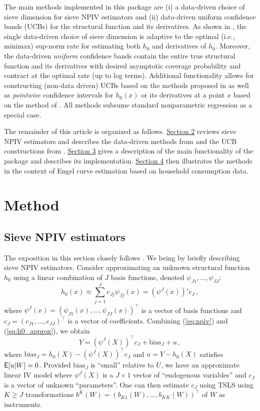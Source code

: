 \documentclass[
]{jss}
\begin{document}
The main methods implemented in this package are (i) a data-driven
choice of sieve dimension for sieve NPIV estimators and (ii) data-driven
uniform confidence bands (UCBs) for the structural function and its
derivatives. As shown in \citet{CCK}, the single data-driven choice of
sieve dimension is adaptive to the optimal (i.e., minimax) sup-norm rate
for estimating both \(h_0\) and derivatives of \(h_0\). Moreover, the
data-driven \emph{uniform} confidence bands contain the entire true
structural function and its derivatives with desired asymptotic coverage
probability and contract at the optimal rate (up to log terms).
Additional functionality allows for constructing (non-data driven) UCBs
based on the methods proposed in \citet{CCQE} as well as
\emph{pointwise} confidence intervals for \(h_0(x)\) or its derivatives
at a point \(x\) based on the method of \citet{ChenPouzo}. All methods
subsume standard nonparametric regression as a special case.

The remainder of this article is organized as follows.
\protect\hyperlink{method}{Section 2} reviews sieve NPIV estimators and
describes the data-driven methods from \citet{CCK} and the UCB
constructions from \citet{CCQE}. \protect\hyperlink{desc}{Section 3}
gives a description of the main functionality of the package 
and describes its implementation. \protect\hyperlink{engel}{Section 4}
then illustrates the methods in the context of Engel curve estimation
based on household consumption data.

\hypertarget{method}{%
\section{Method}\label{method}}

\hypertarget{sieve-npiv-estimators}{%
\subsection{Sieve NPIV estimators}\label{sieve-npiv-estimators}}

The exposition in this section closely follows \citet{CCK}. We being by
briefly describing sieve NPIV estimators. Consider approximating an
unknown structural function \(h_0\) using a linear combination of \(J\)
basis functions, denoted \(\psi_{J1},\ldots,\psi_{JJ}\):
\begin{equation}\label{eq:h0_approx}
 h_0(x) \approx \sum_{j=1}^J c_{Jj} \psi_{Jj}(x) = (\psi^J(x))'c_J\,,
\end{equation} where
\(\psi^J(x) = (\psi_{J1}(x),\ldots,\psi_{JJ}(x))^\top\) is a vector of
basis functions and \(c_J = (c_{J1},\ldots,c_{JJ})^\top\) is a vector of
coefficients. Combining (\ref{eq:npiv}) and (\ref{eq:h0_approx}), we
obtain \[
 Y = (\psi^J(X))^\top c_J + \mathrm{bias}_J + u\,,
\] where \(\mathrm{bias}_J = h_0(X) - (\psi^J(X))^\top c_J\) and
\(u = Y - h_0(X)\) satisfies \(\mathsf{E}[u|W] = 0\). Provided
\(\mathrm{bias}_J\) is ``small'' relative to \(U\), we have an
approximate linear IV model where \(\psi^J(X)\) is a \(J\times 1\)
vector of ``endogenous variables'' and \(c_J\) is a vector of unknown
``parameters''. One can then estimate \(c_J\) using TSLS using
\(K \geq J\) transformations
\(b^K(W)= (b_{K1}(W),\ldots,b_{KK}(W))^\top\) of \(W\) as instruments.
\end{document}
